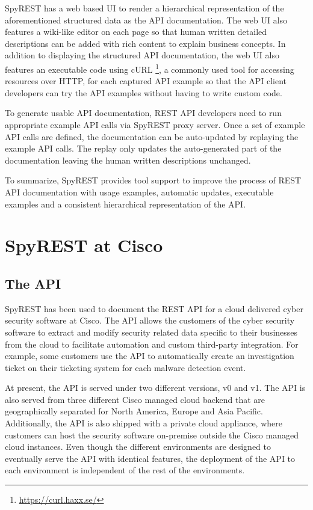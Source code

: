 \documentclass[10pt, conference]{IEEEtran}
\begin{document}
SpyREST has a web based UI to render a hierarchical representation of the aforementioned structured data as the API documentation. The web UI also features a wiki-like editor on each page so that human written detailed descriptions can be added with rich content to explain business concepts. In addition to displaying the structured API documentation, the web UI also features an executable code using cURL \footnote{\url{https://curl.haxx.se/}}, a commonly used tool for accessing resources over HTTP, for each captured API example so that the API client developers can try the API examples without having to write custom code.

To generate usable API documentation, REST API developers need to run appropriate example API calls via SpyREST proxy server. Once a set of example API calls are defined, the documentation can be auto-updated by replaying the example API calls. The replay only updates the auto-generated part of the documentation leaving the human written descriptions unchanged.

To summarize, SpyREST provides tool support to improve the process of REST API documentation with usage examples, automatic updates, executable examples and a consistent hierarchical representation of the API.

\section{SpyREST at Cisco}

\subsection{The API} %
\label{sub:the_api}
SpyREST has been used to document the REST API for a cloud delivered cyber security software at Cisco. The API allows the customers of the cyber security software to extract and modify security related data specific to their businesses from the cloud to facilitate automation and custom third-party integration. For example, some customers use the API to automatically create an investigation ticket on their ticketing system for each malware detection event.

At present, the API is served under two different versions, v0 and v1. The API is also served from three different Cisco managed cloud backend that are geographically separated for North America, Europe and Asia Pacific. Additionally, the API is also shipped with a private cloud appliance, where customers can host the security software on-premise outside the Cisco managed cloud instances. Even though the different environments are designed to eventually serve the API with identical features, the deployment of the API to each environment is independent of the rest of the environments.
\end{document}
